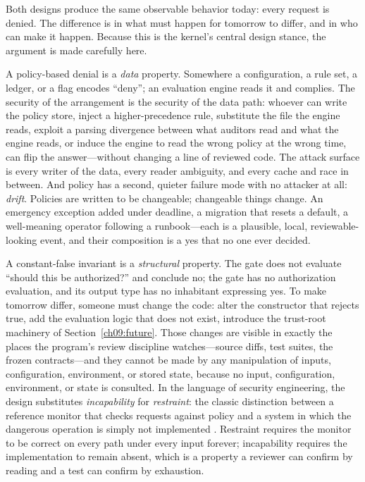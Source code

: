 Both designs produce the same observable behavior today: every request is denied. The difference is in what must happen for tomorrow to differ, and in who can make it happen. Because this is the kernel's central design stance, the argument is made carefully here.

A policy-based denial is a \emph{data} property. Somewhere a configuration, a rule set, a ledger, or a flag encodes ``deny''; an evaluation engine reads it and complies. The security of the arrangement is the security of the data path: whoever can write the policy store, inject a higher-precedence rule, substitute the file the engine reads, exploit a parsing divergence between what auditors read and what the engine reads, or induce the engine to read the wrong policy at the wrong time, can flip the answer---without changing a line of reviewed code. The attack surface is every writer of the data, every reader ambiguity, and every cache and race in between. And policy has a second, quieter failure mode with no attacker at all: \emph{drift}. Policies are written to be changeable; changeable things change. An emergency exception added under deadline, a migration that resets a default, a well-meaning operator following a runbook---each is a plausible, local, reviewable-looking event, and their composition is a yes that no one ever decided.

A constant-false invariant is a \emph{structural} property. The gate does not evaluate ``should this be authorized?'' and conclude no; the gate has no authorization evaluation, and its output type has no inhabitant expressing yes. To make tomorrow differ, someone must change the code: alter the constructor that rejects true, add the evaluation logic that does not exist, introduce the trust-root machinery of Section~\ref{ch09:future}. Those changes are visible in exactly the places the program's review discipline watches---source diffs, test suites, the frozen contracts---and they cannot be made by any manipulation of inputs, configuration, environment, or stored state, because no input, configuration, environment, or state is consulted. In the language of security engineering, the design substitutes \emph{incapability} for \emph{restraint}: the classic distinction between a reference monitor that checks requests against policy and a system in which the dangerous operation is simply not implemented \cite{anderson}. Restraint requires the monitor to be correct on every path under every input forever; incapability requires the implementation to remain absent, which is a property a reviewer can confirm by reading and a test can confirm by exhaustion.

